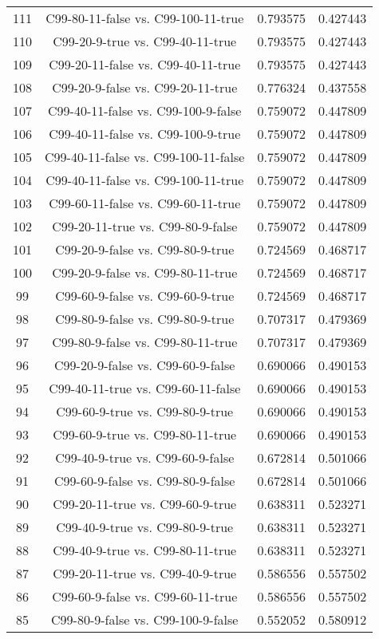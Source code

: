 \documentclass[a4paper,10pt]{article}
\begin{document}
\begin{landscape}
\begin{table}[!htp]
\begin{tabular}{cccc}
111&C99-80-11-false vs. C99-100-11-true&0.793575&0.427443\\
110&C99-20-9-true vs. C99-40-11-true&0.793575&0.427443\\
109&C99-20-11-false vs. C99-40-11-true&0.793575&0.427443\\
108&C99-20-9-false vs. C99-20-11-true&0.776324&0.437558\\
107&C99-40-11-false vs. C99-100-9-false&0.759072&0.447809\\
106&C99-40-11-false vs. C99-100-9-true&0.759072&0.447809\\
105&C99-40-11-false vs. C99-100-11-false&0.759072&0.447809\\
104&C99-40-11-false vs. C99-100-11-true&0.759072&0.447809\\
103&C99-60-11-false vs. C99-60-11-true&0.759072&0.447809\\
102&C99-20-11-true vs. C99-80-9-false&0.759072&0.447809\\
101&C99-20-9-false vs. C99-80-9-true&0.724569&0.468717\\
100&C99-20-9-false vs. C99-80-11-true&0.724569&0.468717\\
99&C99-60-9-false vs. C99-60-9-true&0.724569&0.468717\\
98&C99-80-9-false vs. C99-80-9-true&0.707317&0.479369\\
97&C99-80-9-false vs. C99-80-11-true&0.707317&0.479369\\
96&C99-20-9-false vs. C99-60-9-false&0.690066&0.490153\\
95&C99-40-11-true vs. C99-60-11-false&0.690066&0.490153\\
94&C99-60-9-true vs. C99-80-9-true&0.690066&0.490153\\
93&C99-60-9-true vs. C99-80-11-true&0.690066&0.490153\\
92&C99-40-9-true vs. C99-60-9-false&0.672814&0.501066\\
91&C99-60-9-false vs. C99-80-9-false&0.672814&0.501066\\
90&C99-20-11-true vs. C99-60-9-true&0.638311&0.523271\\
89&C99-40-9-true vs. C99-80-9-true&0.638311&0.523271\\
88&C99-40-9-true vs. C99-80-11-true&0.638311&0.523271\\
87&C99-20-11-true vs. C99-40-9-true&0.586556&0.557502\\
86&C99-60-9-false vs. C99-60-11-true&0.586556&0.557502\\
85&C99-80-9-false vs. C99-100-9-false&0.552052&0.580912\\

\end{tabular}
\end{table}
\end{landscape}
\end{document}
